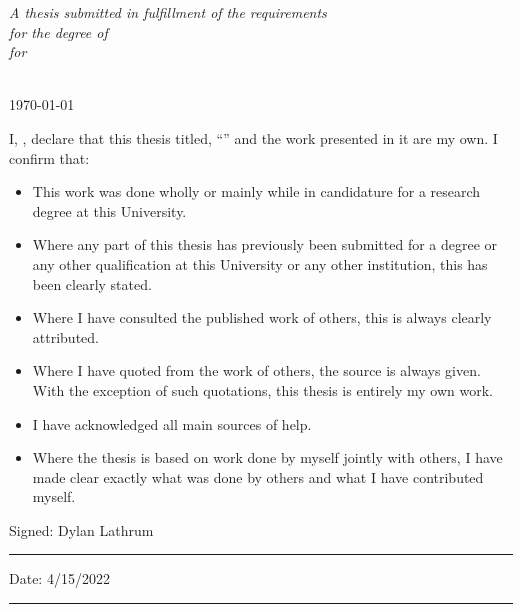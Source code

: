 \documentclass[
11pt, %
english, %
singlespacing, %
headsepline, %
]{MastersDoctoralThesis} %
\begin{document}
\begin{titlepage}
\begin{center}
		\vfill

		\large \textit{A thesis submitted in fulfillment of the requirements\\ for the degree of \degreename}\\[0.3cm] %
		\textit{for}\\[0.4cm]
		\deptname\\[2cm] %

		\vfill

		{\large \today}\\[4cm] %

		\vfill
	\end{center}
\end{titlepage}


\begin{declaration}
	\addchaptertocentry{\authorshipname} %
	\noindent I, \authorname, declare that this thesis titled, \enquote{\ttitle} and the work presented in it are my own. I confirm that:

	\begin{itemize}
		\item This work was done wholly or mainly while in candidature for a research degree at this University.
		\item Where any part of this thesis has previously been submitted for a degree or any other qualification at this University or any other institution, this has been clearly stated.
		\item Where I have consulted the published work of others, this is always clearly attributed.
		\item Where I have quoted from the work of others, the source is always given. With the exception of such quotations, this thesis is entirely my own work.
		\item I have acknowledged all main sources of help.
		\item Where the thesis is based on work done by myself jointly with others, I have made clear exactly what was done by others and what I have contributed myself.\\
	\end{itemize}

	\noindent Signed: Dylan Lathrum\\
	\rule[0.5em]{25em}{0.5pt} %

	\noindent Date: 4/15/2022\\
	\rule[0.5em]{25em}{0.5pt} %
\end{declaration}
\end{document}

